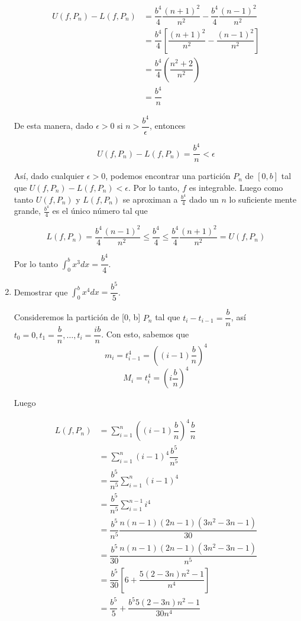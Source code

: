 \documentclass{report}
\begin{document}
\begin{enumerate}
        \begin{align*}
            U(f, P_n) - L(f, P_n) &= \dfrac{b^4}{4} \dfrac{(n+1)^2}{n^2} - \dfrac{b^4}{4} \dfrac{(n-1)^2}{n^2}\\
            &= \dfrac{b^4}{4} \left[\dfrac{(n+1)^2}{n^2} - \dfrac{(n-1)^2}{n^2}\right]\\
            &= \dfrac{b^4}{4} \left(\dfrac{n^2+2}{n^2}\right)\\
            &= \dfrac{b^4}{n}
        \end{align*}

        De esta manera, dado $\epsilon > 0$ si $n > \dfrac{b^4}{\epsilon}$, entonces

        $$U(f, P_n) - L(f, P_n) = \dfrac{b^4}{n} < \epsilon$$

        Así, dado cualquier $\epsilon > 0$, podemos encontrar una partición $P_n$ de $[0,b]$ tal que $U(f, P_n) - L(f, P_n) < \epsilon$. Por lo tanto, $f$ es integrable. Luego como tanto $U(f, P_n)$ y $L(f, P_n)$ se aproximan a $\frac{b^4}{4}$ dado un $n$ lo suficiente mente grande, $\frac{b^4}{4}$ es el único número tal que

        $$L(f, P_n) = \dfrac{b^4}{4} \dfrac{(n-1)^2}{n^2} \leq \dfrac{b^4}{4} \leq \dfrac{b^4}{4} \dfrac{(n+1)^2}{n^2} = U(f, P_n)$$

        Por lo tanto $\int_{0}^{b} x^3 dx = \dfrac{b^4}{4}$.

        \item Demostrar que $\int_{0}^{b}x^4dx = \dfrac{b^5}{5}$.

        Consideremos la partición de [0, b] $P_n$ tal que $t_i - t_{i-1} = \dfrac{b}{n}$, así $t_0 = 0, t_1 = \dfrac{b}{n}, \dots , t_i =\dfrac{ib}{n}$. Con esto, sabemos que
        $$m_i = t_{i-1}^4 = \left((i-1)\dfrac{b}{n}\right)^4$$
        $$M_i = t_{i}^4 = \left(i\dfrac{b}{n}\right)^4$$

        Luego

        \begin{align*}
            L(f, P_n) &= \sum_{i=1}^{n}\left((i-1)\dfrac{b}{n}\right)^4\dfrac{b}{n}\\
            &= \sum_{i=1}^{n}(i-1)^4\dfrac{b^5}{n^5}\\
            &= \dfrac{b^5}{n^5} \sum_{i=1}^{n}(i-1)^4\\
            &= \dfrac{b^5}{n^5} \sum_{i=1}^{n-1}i^4\\
            &= \dfrac{b^5}{n^5} \dfrac{n(n-1)(2n-1)(3n^2-3n-1)}{30}\\
            &= \dfrac{b^5}{30} \dfrac{n(n-1)(2n-1)(3n^2-3n-1)}{n^5}\\
            &= \dfrac{b^5}{30} \left[6 + \dfrac{5(2-3n)n^2-1}{n^4}\right]\\
            &= \dfrac{b^5}{5} + \dfrac{b^5 5(2-3n)n^2-1}{30n^4}
        \end{align*}


\end{enumerate}
\end{document}
